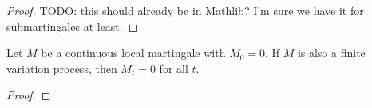 \begin{proof}
TODO: this should already be in Mathlib? I'm sure we have it for submartingales at least.
\end{proof}


\begin{theorem}\label{thm:IsLocalMartingale.eq_zero_of_finiteVariation}
Let $M$ be a continuous local martingale with $M_0 = 0$. If $M$ is also a finite variation process, then $M_t = 0$ for all $t$.
\end{theorem}

\begin{proof}

\end{proof}
